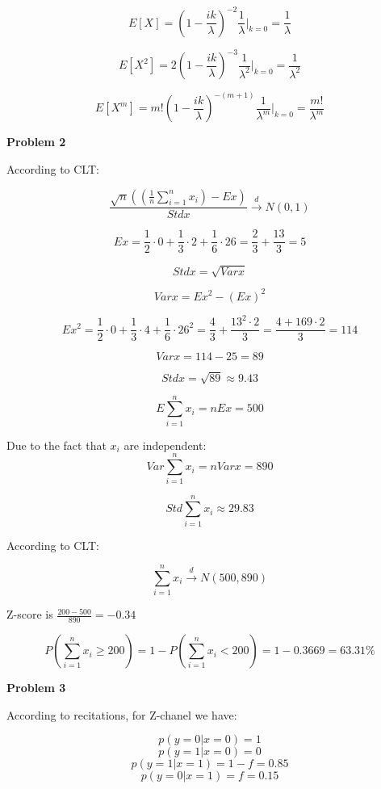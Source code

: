 \documentclass[12pt]{article}
\begin{document}
	$$ E[X] = \left( 1 - \frac{ik}{\lambda} \right)^{-2} \frac{1}{\lambda} |_{k = 0} = \frac{1}{\lambda}$$
	
	$$ E[X^2] = 2\left( 1 - \frac{ik}{\lambda} \right)^{-3} \frac{1}{\lambda^2} |_{k = 0} = \frac{1}{\lambda^2}$$
	
	$$ E[X^m] = m!\left( 1 - \frac{ik}{\lambda} \right)^{-(m + 1)} \frac{1}{\lambda^m} |_{k = 0} = \frac{m!}{\lambda^m} $$
	
	\bigskip
	
	\textbf{Problem 2}
	
	\bigskip

	According to CLT:
	
	$$ \frac{\sqrt{n} \left( \left( \frac{1}{n} \sum_{i = 1}^{n} x_i \right) - Ex \right)}{Stdx} \xrightarrow{d} N(0, 1) $$
		
	$$ Ex = \frac{1}{2} \cdot 0 + \frac{1}{3} \cdot 2 + \frac{1}{6} \cdot 26 = \frac{2}{3} + \frac{13}{3} = 5 $$
	
	$$ Std x = \sqrt{Var x}$$
	
	$$ Var x = Ex^2 - (Ex)^2 $$
	
	$$ Ex^2 = \frac{1}{2} \cdot 0 + \frac{1}{3} \cdot 4 + \frac{1}{6} \cdot 26^2 = \frac{4}{3} + \frac{13^2 \cdot 2}{3} = \frac{4 + 169 \cdot 2}{3} = 
	114 $$
	
	$$ Varx = 114 - 25 = 89 $$
	
	$$ Stdx = \sqrt{89} \approx 9.43 $$
	
	$$ E \sum_{i = 1}^{n} x_i = n Ex = 500 $$
	
	Due to the fact that $x_i$ are independent:
	$$ Var \sum_{i = 1}^{n} x_i = n Varx = 890 $$
	
	$$ Std \sum_{i = 1}^{n} x_i \approx 29.83 $$
	
	According to CLT:
	
	$$ \sum_{i = 1}^{n} x_i \xrightarrow{d} N(500, 890)$$
	
	Z-score is $\frac{200 - 500}{890} = - 0.34$
	
	$$ P \left( \sum_{i = 1}^{n} x_i  \geq 200 \right) = 1 - P \left( \sum_{i = 1}^{n} x_i  < 200 \right) = 1 - 0.3669 = 63.31 \% $$
	
	\bigskip
	
	\textbf{Problem 3}
	
	\bigskip
	
	According to recitations, for Z-chanel we have: 
	
	$$ p(y = 0 | x = 0) = 1 $$
	$$ p(y = 1 | x = 0) = 0 $$
	$$ p(y = 1 | x = 1) = 1 - f = 0.85 $$
	$$ p(y = 0 | x = 1) = f = 0.15 $$
	
\end{document}
